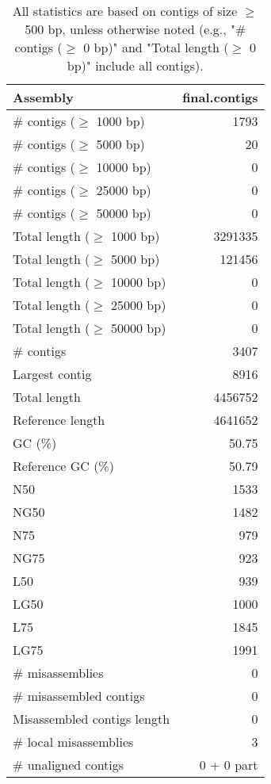 \documentclass[12pt,a4paper]{article}
\begin{document}
\begin{table}[ht]
\begin{center}
\caption{All statistics are based on contigs of size $\geq$ 500 bp, unless otherwise noted (e.g., "\# contigs ($\geq$ 0 bp)" and "Total length ($\geq$ 0 bp)" include all contigs).}
\begin{tabular}{|l*{1}{|r}|}
\hline
Assembly & final.contigs \\ \hline
\# contigs ($\geq$ 1000 bp) & 1793 \\ \hline
\# contigs ($\geq$ 5000 bp) & 20 \\ \hline
\# contigs ($\geq$ 10000 bp) & 0 \\ \hline
\# contigs ($\geq$ 25000 bp) & 0 \\ \hline
\# contigs ($\geq$ 50000 bp) & 0 \\ \hline
Total length ($\geq$ 1000 bp) & 3291335 \\ \hline
Total length ($\geq$ 5000 bp) & 121456 \\ \hline
Total length ($\geq$ 10000 bp) & 0 \\ \hline
Total length ($\geq$ 25000 bp) & 0 \\ \hline
Total length ($\geq$ 50000 bp) & 0 \\ \hline
\# contigs & 3407 \\ \hline
Largest contig & 8916 \\ \hline
Total length & 4456752 \\ \hline
Reference length & 4641652 \\ \hline
GC (\%) & 50.75 \\ \hline
Reference GC (\%) & 50.79 \\ \hline
N50 & 1533 \\ \hline
NG50 & 1482 \\ \hline
N75 & 979 \\ \hline
NG75 & 923 \\ \hline
L50 & 939 \\ \hline
LG50 & 1000 \\ \hline
L75 & 1845 \\ \hline
LG75 & 1991 \\ \hline
\# misassemblies & 0 \\ \hline
\# misassembled contigs & 0 \\ \hline
Misassembled contigs length & 0 \\ \hline
\# local misassemblies & 3 \\ \hline
\# unaligned contigs & 0 + 0 part \\ \hline

\end{tabular}
\end{center}
\end{table}
\end{document}
